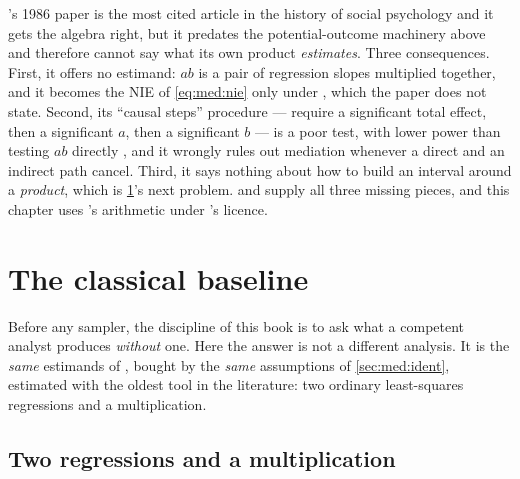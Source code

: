 \begin{remark}
's 1986 paper is the most cited article in the history of social psychology
and it gets the algebra right, but it predates the potential-outcome machinery above and therefore
cannot say what its own product \emph{estimates}. Three consequences. First, it offers no estimand:
$a b$ is a pair of regression slopes multiplied together, and it becomes the NIE of
\cref{eq:med:nie} only under , which the paper does not
state. Second, its ``causal steps'' procedure --- require a significant total effect, then a
significant $a$, then a significant $b$ --- is a poor test, with lower power than testing $ab$
directly \citep{mackinnon2002}, and it wrongly rules out mediation whenever a direct and an indirect
path cancel. Third, it says nothing about how to build an interval around a \emph{product}, which is
\cref{sec:med:classical}'s next problem.  and \citet{vanderweele2015} supply all
three missing pieces, and this chapter uses \citeauthor{baron1986}'s arithmetic under
\citeauthor{imai2010}'s licence.
\end{remark}

\section{The classical baseline}
\label{sec:med:classical}

Before any sampler, the discipline of this book is to ask what a competent analyst produces
\emph{without} one. Here the answer is not a different analysis. It is the \emph{same} estimands of
, bought by the \emph{same} assumptions of \cref{sec:med:ident},
estimated with the oldest tool in the literature: two ordinary least-squares regressions and a
multiplication.

\subsection*{Two regressions and a multiplication}

